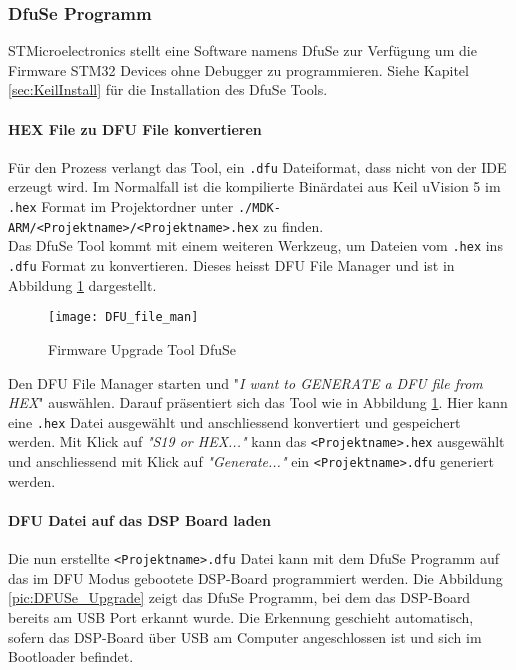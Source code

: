 \subsubsection{DfuSe Programm}
\label{sec:DFUSe}

STMicroelectronics stellt eine Software namens DfuSe zur Verfügung um die Firmware STM32 Devices ohne Debugger zu programmieren. Siehe Kapitel \ref{sec:KeilInstall} für die Installation des DfuSe Tools.

\paragraph{HEX File zu DFU File konvertieren}

Für den Prozess verlangt das Tool, ein \texttt{.dfu} Dateiformat, dass nicht von der IDE erzeugt wird. 
Im Normalfall ist die kompilierte Binärdatei aus Keil uVision 5 im \texttt{.hex} Format im Projektordner unter \texttt{./MDK-ARM/<Projektname>/<Projektname>.hex} zu finden.\\

Das DfuSe Tool kommt mit einem weiteren Werkzeug, um Dateien vom \texttt{.hex} ins \texttt{.dfu} Format zu konvertieren. 
Dieses heisst DFU File Manager und ist in Abbildung \ref{pic:DFU_file_man} dargestellt.

\begin{figure}[H]
	\centering
	\texttt{[image: DFU\_file\_man]}
	\caption{Firmware Upgrade Tool DfuSe}
	\label{pic:DFU_file_man}
\end{figure}

Den DFU File Manager starten und "\textit{I want to GENERATE a DFU file from HEX}" auswählen.
Darauf präsentiert sich das Tool wie in Abbildung \ref{pic:DFU_file_man}. Hier kann eine \texttt{.hex} Datei ausgewählt und anschliessend konvertiert und gespeichert werden.
Mit Klick auf \textit{"S19 or HEX..."} kann das \texttt{<Projektname>.hex} ausgewählt und anschliessend mit Klick auf \textit{"Generate..."} ein \texttt{<Projektname>.dfu} generiert werden.

\paragraph{DFU Datei auf das DSP Board laden}

Die nun erstellte \texttt{<Projektname>.dfu} Datei kann mit dem DfuSe Programm auf das im DFU Modus gebootete DSP-Board programmiert werden. 
Die Abbildung \ref{pic:DFUSe_Upgrade} zeigt das DfuSe Programm, bei dem das DSP-Board bereits am USB Port erkannt wurde. Die Erkennung geschieht automatisch, sofern das DSP-Board über USB am Computer angeschlossen ist und sich im Bootloader befindet.

